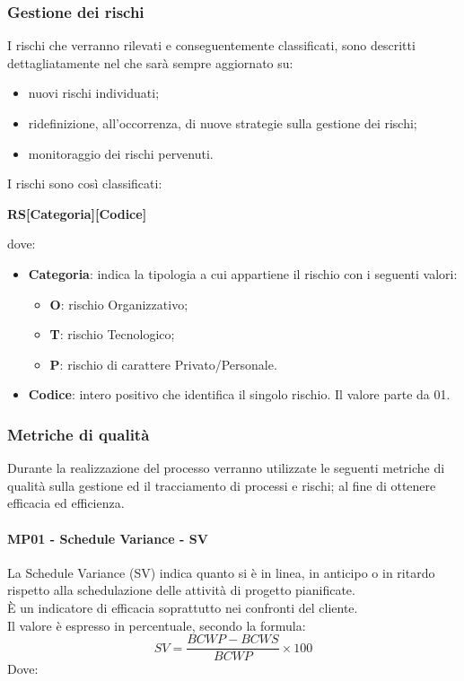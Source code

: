 		 \subsubsection{Gestione dei rischi}
		 I rischi che verranno rilevati e conseguentemente classificati, sono descritti dettagliatamente nel  che sarà sempre aggiornato su:
		 \begin{itemize}
		 	\item nuovi rischi individuati;
		 	\item ridefinizione, all'occorrenza, di nuove strategie sulla gestione dei rischi;
		 	\item monitoraggio dei rischi pervenuti.
		 \end{itemize}
	 	\noindent
	 	I rischi sono così classificati:
	 	\begin{center}
	 			{\bfseries RS[Categoria][Codice]}
	 	\end{center}
	 	dove:
	 	\begin{itemize}
	 		\item \textbf{Categoria}: indica la tipologia a cui appartiene il rischio con i seguenti valori:
	 	\begin{itemize}
	 		\item {\bfseries O}: rischio Organizzativo;
	 		\item {\bfseries T}: rischio Tecnologico;
	 		\item {\bfseries P}: rischio di carattere Privato/Personale. \\
	 	\end{itemize}
 			\item \textbf{Codice}: intero positivo che identifica il singolo rischio. Il valore parte da 01.
	 	\end{itemize}
 	\newpage
	 \subsubsection{Metriche di qualità}
	 Durante la realizzazione del processo verranno utilizzate le seguenti metriche di qualità sulla gestione ed il tracciamento di processi e rischi; al fine di ottenere efficacia ed efficienza.
	 \paragraph{MP01 - Schedule Variance - SV}
	 La Schedule Variance (SV) indica quanto si è in linea, in anticipo o in ritardo rispetto alla schedulazione delle attività di progetto pianificate. \\
	 È un indicatore di efficacia soprattutto nei confronti del cliente.\\
	 Il valore è espresso in percentuale, secondo la formula:
	\begin{displaymath}
		SV = \frac{BCWP-BCWS}{BCWP}\times100
	\end{displaymath}
	Dove:

